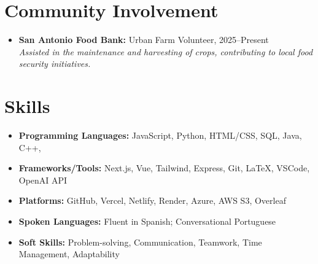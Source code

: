 \documentclass[letterpaper,10pt]{article}
\begin{document}
\section*{Community Involvement}
\begin{itemize}[leftmargin=0in, label={}]
  \item \textbf{San Antonio Food Bank:} Urban Farm Volunteer, \hfill 2025–Present \\
  \textit{Assisted in the maintenance and harvesting of crops, contributing to local food security initiatives.}
\end{itemize}

\section*{Skills}
\begin{itemize}[leftmargin=0in, label={}]
  \item \textbf{Programming Languages:} JavaScript, Python, HTML/CSS, SQL, Java, C++, 
  \item \textbf{Frameworks/Tools:} Next.js, Vue, Tailwind, Express, Git, LaTeX, VSCode, OpenAI API
  \item \textbf{Platforms:} GitHub, Vercel, Netlify, Render, Azure, AWS S3, Overleaf
  \item \textbf{Spoken Languages:} Fluent in Spanish; Conversational Portuguese
  \item \textbf{Soft Skills:} Problem-solving, Communication, Teamwork, Time Management, Adaptability
\end{itemize}
\end{document}
